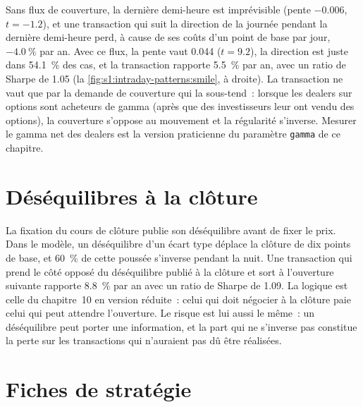 Sans flux de couverture, la dernière demi-heure est imprévisible (pente $-0.006$, $t = -1.2$), et une transaction qui suit la direction de la journée pendant la dernière demi-heure
perd, à cause de ses coûts d'un point de base par jour, $-4.0~\%$ par an. Avec ce flux, la pente vaut 0.044 ($t = 9.2$), la direction est juste dans 54.1~\% des cas, et la transaction
rapporte 5.5~\% par an, avec un ratio de Sharpe de 1.05 (la \cref{fig:s1:intraday-patterns:smile}, à droite). La transaction ne vaut que par la demande de couverture qui la sous-tend~:
lorsque les dealers sur options sont acheteurs de gamma (après que des investisseurs leur ont vendu des options), la couverture s'oppose au mouvement et la régularité s'inverse. Mesurer le
gamma net des dealers est la version praticienne du paramètre \texttt{gamma} de ce chapitre.

\section{Déséquilibres à la clôture}

La fixation du cours de clôture publie son déséquilibre avant de fixer le prix. Dans le modèle, un déséquilibre d'un écart type déplace la clôture de dix points de base, et
60~\% de cette poussée s'inverse pendant la nuit. Une transaction qui prend le côté opposé du déséquilibre publié à la clôture et sort à l'ouverture suivante rapporte 8.8~\% par an
avec un ratio de Sharpe de 1.09. La logique est celle du chapitre~10 en version réduite~: celui qui doit négocier à la clôture paie celui qui peut attendre l'ouverture. Le risque est lui aussi
le même~: un déséquilibre peut porter une information, et la part qui ne s'inverse pas constitue la perte sur les transactions qui n'auraient pas dû être réalisées.

\section{Fiches de stratégie}

